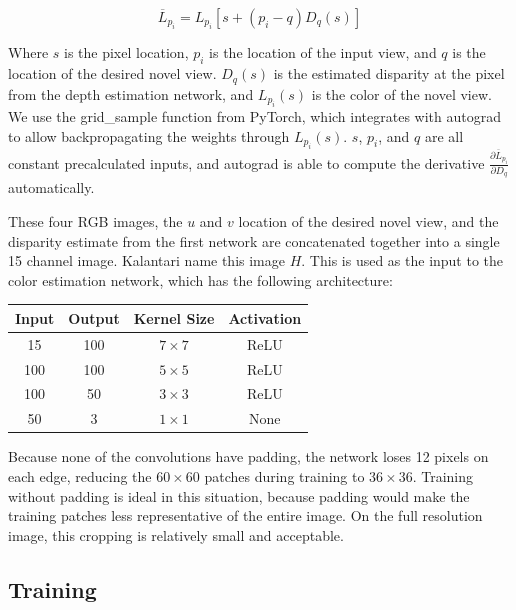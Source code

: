 \documentclass[10pt,twocolumn,letterpaper]{article}
\begin{document}
$$
\overline{L}_{p_i} = L_{p_i} \left[ s + \left(p_i - q\right) D_q(s) \right]
$$

Where $s$ is the pixel location, $p_i$ is the location of the input view, and $q$ is the location of the
desired novel view. $D_q(s)$ is the estimated disparity at the pixel from the depth estimation network,
and $L_{p_i}(s)$ is the color of the novel view. We use the grid\_sample function from PyTorch, which integrates
with autograd to allow backpropagating the weights through $L_{p_i}(s)$. $s$, $p_i$, and $q$ are all 
constant precalculated inputs, and autograd is able to compute the derivative 
$\frac{\partial \overline{L}_{p_i}}{\partial D_q}$ automatically. 

These four RGB images, the $u$ and $v$ location of the desired novel view, and the disparity estimate from the first network are concatenated
together into a single 15 channel image. Kalantari \etal name this image $H$. This is used as the input to the color estimation network, which
has the following architecture:

\begin{center}
\begin{tabular}{|c c c c|}
    \hline
    Input & Output & Kernel Size & Activation \\
    \hline
    15 & 100 & $7 \times 7$ & ReLU \\
    100 & 100 & $5 \times 5$ & ReLU \\
    100 & 50 & $3 \times 3$ & ReLU \\
    50 & 3 & $1 \times 1$ & None \\
    \hline
\end{tabular}
\end{center}

Because none of the convolutions have padding, the network loses 12 pixels on each edge, reducing
the $60 \times 60$ patches during training to $36 \times 36$. Training without padding is ideal in this situation, 
because padding would make the training patches less representative of the entire image. On the full resolution image,
this cropping is relatively small and acceptable.

\subsection{Training}
\end{document}
